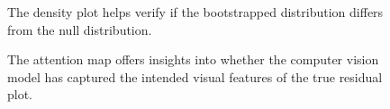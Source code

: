 \documentclass[
doublespace,
  times]{anzsauth}
\begin{document}
\begin{figure}


\caption{\label{fig-autovi-web-workflow-example6}The density plot helps
verify if the bootstrapped distribution differs from the null
distribution.}

\end{figure}%

\begin{figure}


\caption{\label{fig-autovi-web-workflow-example7}The attention map
offers insights into whether the computer vision model has captured the
intended visual features of the true residual plot.}

\end{figure}%
\end{document}

